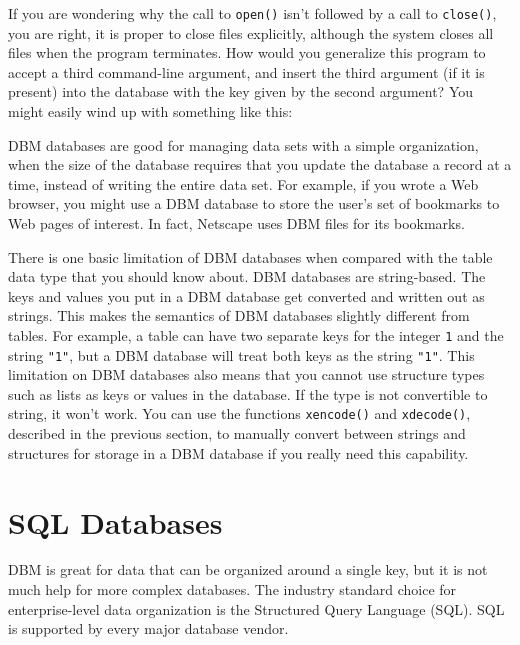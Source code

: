 If you are wondering why the call to \texttt{open()}
isn't followed by a call to \texttt{close()}, you are
right, it is proper to close files explicitly, although the system
closes all files when the program terminates. How would you generalize
this program to accept a third command-line argument, and insert the
third argument (if it is present) into the database with the key given
by the second argument? You might easily wind up with something like
this:


DBM databases are good for managing data sets with a simple
organization, when the size of the database requires that you update
the database a record at a time, instead of writing the entire data
set. For example, if you wrote a Web browser, you might use a DBM
database to store the user's set of bookmarks to Web
pages of interest. In fact, Netscape uses DBM files for its bookmarks.

There is one basic limitation of DBM databases when compared with the
table data type that you should know about. DBM databases are
string-based. The keys and values you put in a DBM database get
converted and written out as strings. This makes the semantics of DBM
databases slightly different from tables. For example, a table can have
two separate keys for the integer \texttt{1} and the string
\texttt{"1"}, but a DBM database will treat
both keys as the string \texttt{"1"}. This
limitation on DBM databases also means that you cannot use structure
types such as lists as keys or values in the database. If the type is
not convertible to string, it won't work. You can use
the functions \texttt{xencode()} and \texttt{xdecode()}, described in
the previous section, to manually convert between strings and
structures for storage in a DBM database if you really need this
capability.

\section[SQL Databases]{SQL Databases}

DBM is great for data that can be organized around a single
key, but it is not much help for more complex databases. The industry
standard choice for enterprise-level data organization is the
Structured Query Language (SQL). SQL is supported by every major
database vendor.

